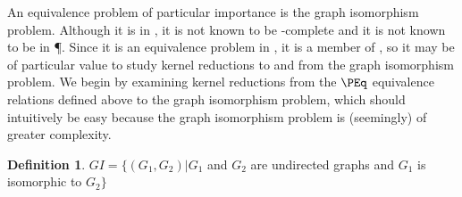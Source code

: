 \documentclass{article}
\theoremstyle{definition}
\newtheorem{definition}{Definition}%
\begin{document}
An equivalence problem of particular importance is the graph isomorphism
problem. Although it is in \NP, it is not known to be \NP-complete and it is
not known to be in \P. Since it is an equivalence problem in \NP, it is a
member of \NPEq, so it may be of particular value to study kernel reductions to
and from the graph isomorphism problem. We begin by examining kernel reductions
from the $\PEq$ equivalence relations defined above to the graph isomorphism
problem, which should intuitively be easy because the graph isomorphism problem
is (seemingly) of greater complexity.

\begin{definition}
  $GI=\{(G_1, G_2)|G_1$ and $G_2$ are undirected graphs and $G_1$ is isomorphic
  to $G_2\}$
\end{definition}
\end{document}
